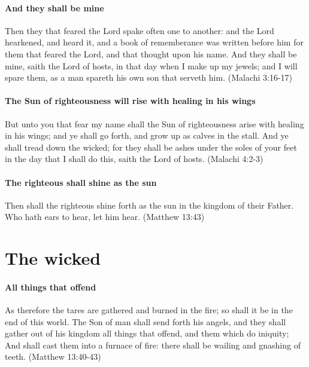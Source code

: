 \paragraph{And they shall be mine}
Then they that feared the Lord spake often one to another: and the Lord hearkened, and heard it, and a book of rememberance was written before him for them that feared the Lord, and that thought upon his name. And they shall be mine, saith the Lord of hosts, in that day when I make up my jewels; and I will spare them, as a man spareth his own son that serveth him. (Malachi 3:16-17)

\paragraph{The Sun of righteousness will rise with healing in his wings}
But unto you that fear my name shall the Sun of righteousness arise with healing in his wings; and ye shall go forth, and grow up as calves in the stall. And ye shall tread down the wicked; for they shall be ashes under the soles of your feet in the day that I shall do this, saith the Lord of hosts. (Malachi 4:2-3)

\paragraph{The righteous shall shine as the sun}
Then shall the righteous shine forth as the sun in the kingdom of their Father. Who hath ears to hear, let him hear. (Matthew 13:43)

\section{The wicked}

\paragraph{All things that offend}
As therefore the tares are gathered and burned in the fire; so shall it be in the end of this world. The Son of man shall send forth his angels, and they shall gather out of his kingdom all things that offend, and them which do iniquity; And shall cast them into a furnace of fire: there shall be wailing and gnashing of teeth. (Matthew 13:40-43)

